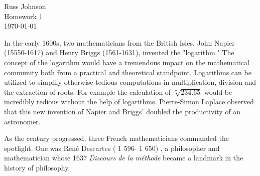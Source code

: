 \documentclass[12pt]{article}
\begin{document}
\begin{flushright}
Russ Johnson\\
Homework 1\\
\today\\
\end{flushright}

In the early 1600s, two mathematicians from the British Isles, John Napier (15550-1617) and Henry Briggs (1561-1631), invented the "logarithm." The concept of the logarithm would have a tremendous impact on the mathematical community both from a practical and theoretical standpoint. Logarithms can be utilized to simplify otherwise tedious computations in multiplication, division and the extraction of roots. For example the calculation of $\sqrt[7]{234.65}$ would be incredibly tedious without the help of logarithms. Pierre-Simon Laplace observed that this new invention of Napier and Briggs' doubled the productivity of an astronomer.

As the century progressed, three French mathematicians commanded
the spotlight. One was Ren\'{e} Descartes ( 1 596- 1 650) , a philosopher and
mathematician whose 1637 {\it Discours de la m\'{e}thode} became a landmark
in the history of philosophy. 
\end{document}

